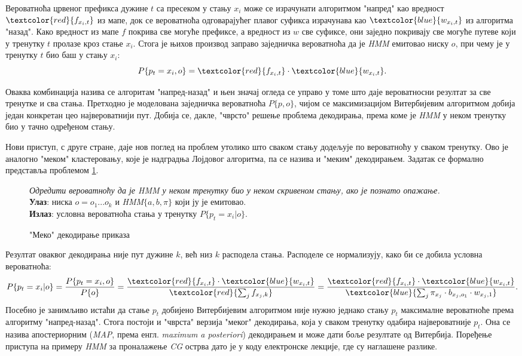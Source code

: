 \documentclass[12pt,oneside]{memoir}
\newenvironment{problem}[1][!ht]
{\renewcommand{\algorithmcfname}{Проблем}
\begin{figure}[!ht]
\centering
  \begin{minipage}{.94\linewidth}
	\begin{algorithm}[#1]%
  }{\end{algorithm}
  \end{minipage}
\end{figure}}
\begin{document}
\begin{CJK}{UTF8}{ipxm}
Вероватноћа црвеног префикса дужине $t$ са пресеком у стању $x_i$ може се израчунати алгоритмом "напред" као вредност $\textcolor{red}{f_{x_i, t}}$ из мапе, док се вероватноћа одговарајућег плавог суфикса израчунава као $\textcolor{blue}{w_{x_i, t}}$ из алгоритма "назад". Како вредност из мапе $f$ покрива све могуће префиксе, а вредност из $w$ све суфиксе, они заједно покривају све могуће путеве који у тренутку $t$ пролазе кроз стање $x_i$. Стога је њихов производ заправо заједничка вероватноћа да је \textit{HMM} емитовао ниску $o$, при чему је у тренутку $t$ био баш у стању $x_i$: $$P\{p_t = x_i, o\} = \textcolor{red}{f_{x_i, t}} \cdot \textcolor{blue}{w_{x_i, t}}.$$

Оваква комбинација назива се алгоритам "напред-назад" и њен значај огледа се управо у томе што даје вероватносни резултат за све тренутке и сва стања. Претходно је моделована заједничка вероватноћа $P\{p, o\}$, чијом се максимизацијом Витербијевим алгоритмом добија један конкретан цео највероватнији пут. Добија се, дакле, "чврсто" решење проблема декодирања, према коме је \textit{HMM} у неком тренутку био у тачно одређеном стању.

Нови приступ, с друге стране, даје нов поглед на проблем утолико што сваком стању додељује по вероватноћу у сваком тренутку. Ово је аналогно "меком" кластеровању, које је надградња Лојдовог алгоритма, па се назива и "меким" декодирањем. Задатак се формално представља проблемом \ref{prob:meko}.

\begin{problem}[H]
  \SetAlgoLined
  \textit{Одредити вероватноћу да је \textit{HMM} у неком тренутку био у неком скривеном стању, ако је познато опажање.}\\
  \textbf{Улаз}: ниска $o = o_1...o_k$ и \textit{HMM}$\{a, b, \pi\}$ који ју је емитовао.\\
  \textbf{Излаз}: условна вероватноћа стања у тренутку $P\{p_t = x_i | o\}$.
  \caption[]{"Меко" декодирање приказа\footnotemark}
  \label{prob:meko}
\end{problem}

Резултат оваквог декодирања није пут дужине $k$, већ низ $k$ расподела стања. Расподеле се нормализују, како би се добила условна вероватноћа: $$P\{p_t = x_i | o\} = \frac{P\{p_t = x_i, o\}}{P\{o\}} = \frac{\textcolor{red}{f_{x_i, t}} \cdot \textcolor{blue}{w_{x_i, t}}}{\textcolor{red}{\sum_j f_{x_j, k}}} = \frac{\textcolor{red}{f_{x_i, t}} \cdot \textcolor{blue}{w_{x_i, t}}}{\textcolor{blue}{\sum_j \pi_{x_j} \cdot b_{x_j, o_1} \cdot w_{x_j, 1}}}.$$ Посебно је занимљиво истаћи да стање $p_t$ добијено Витербијевим алгоритмом није нужно једнако стању $p_t$ максималне вероватноће према алгоритму "напред-назад". Стога постоји и "чврста" верзија "меког" декодирања, која у сваком тренутку одабира највероватније $p_t$. Она се назива апостериорним (\textit{MAP}, према енгл. \textit{maximum a posteriori}) декодирањем и може дати боље резултате од Витербија. Поређење приступа на примеру \textit{HMM} за проналажење \textit{CG} острва дато је у коду електронске лекције, где су наглашене разлике.


\end{CJK}
\end{document}
